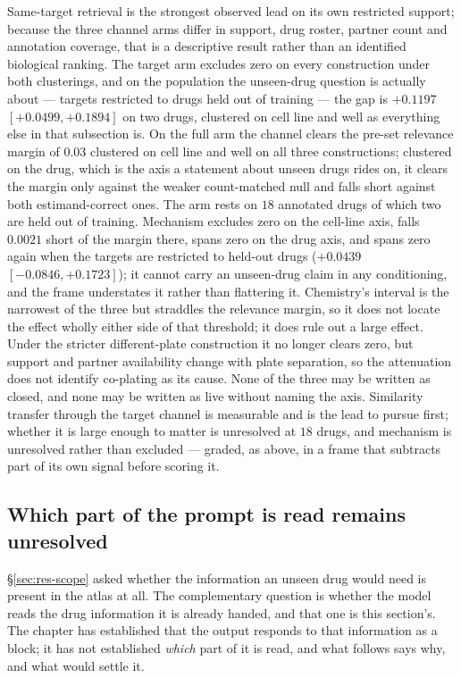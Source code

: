\begin{claim}
Same-target retrieval is the strongest observed lead on its own restricted support; because the
three channel arms differ in support, drug roster, partner count and annotation coverage, that is a
descriptive result rather than an identified biological ranking. The target arm excludes zero on
every construction under both clusterings, and on the population the unseen-drug question is actually
about --- targets restricted to drugs held out of training --- the gap is
$+0.1197$ \nolinebreak[3]$[+0.0499, +0.1894]$ on two drugs, clustered on cell line and well as
everything else in that subsection is. On the full arm the channel clears the pre-set relevance margin
of $0.03$ clustered on cell line and well on all three constructions; clustered on the drug, which
is the axis a statement about unseen drugs rides on, it clears the margin only against the weaker
count-matched null and falls short against both estimand-correct ones. The arm rests on $18$
annotated drugs of which two
are held out of training. Mechanism
excludes zero on the cell-line axis, falls $0.0021$ short of the margin there, spans zero on the
drug axis, and spans zero again when the targets are restricted to held-out drugs
($+0.0439$ \nolinebreak[3]$[-0.0846, +0.1723]$); it cannot carry an unseen-drug claim in any
conditioning, and the frame understates it rather than flattering it. Chemistry's interval is the
narrowest of the three but straddles the relevance margin, so it does not locate the effect wholly
either side of that threshold; it does rule out a large effect. Under the stricter different-plate
construction it no longer clears zero, but support and partner availability change with plate
separation, so the attenuation does not identify co-plating as its cause. None of the three may be written as closed,
and none may be written as live without naming the axis. Similarity transfer through the target
channel is measurable and is the lead to pursue first; whether it is large enough to matter
is unresolved at $18$ drugs, and mechanism is unresolved rather than excluded --- graded, as above,
in a frame that subtracts part of its own signal before scoring it.
\end{claim}

\subsection{Which part of the prompt is read remains unresolved}
\label{sec:res-field}

\S\ref{sec:res-scope} asked whether the information an unseen drug would need is present in the
atlas at all. The complementary question is whether the model reads the drug information it is
already handed, and that one is this section's. The chapter has established that the output responds
to that information as a block; it has not established \emph{which} part of it is read, and what
follows says why, and what would settle it.

